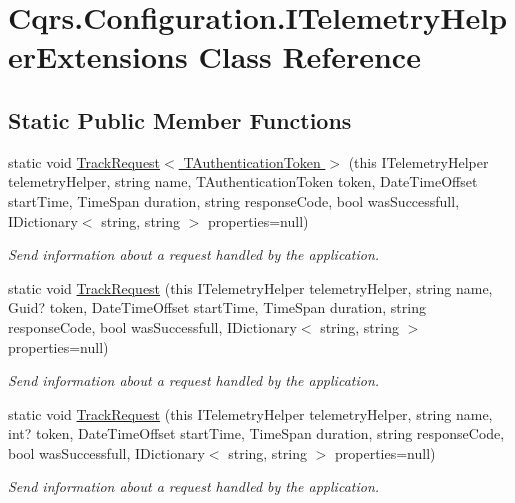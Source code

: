 \hypertarget{classCqrs_1_1Configuration_1_1ITelemetryHelperExtensions}{}\section{Cqrs.\+Configuration.\+I\+Telemetry\+Helper\+Extensions Class Reference}
\label{classCqrs_1_1Configuration_1_1ITelemetryHelperExtensions}
\subsection*{Static Public Member Functions}
\begin{DoxyCompactItemize}
\item 
static void \hyperlink{classCqrs_1_1Configuration_1_1ITelemetryHelperExtensions_a2e4bf3f56dbd0d10acac587499aca7ba}{Track\+Request$<$ T\+Authentication\+Token $>$} (this I\+Telemetry\+Helper telemetry\+Helper, string name, T\+Authentication\+Token token, Date\+Time\+Offset start\+Time, Time\+Span duration, string response\+Code, bool was\+Successfull, I\+Dictionary$<$ string, string $>$ properties=null)
\begin{DoxyCompactList}\small\item\em Send information about a request handled by the application. \end{DoxyCompactList}\item 
static void \hyperlink{classCqrs_1_1Configuration_1_1ITelemetryHelperExtensions_a8e248c0990f9abd8f9d7f06a6e82c1d6}{Track\+Request} (this I\+Telemetry\+Helper telemetry\+Helper, string name, Guid? token, Date\+Time\+Offset start\+Time, Time\+Span duration, string response\+Code, bool was\+Successfull, I\+Dictionary$<$ string, string $>$ properties=null)
\begin{DoxyCompactList}\small\item\em Send information about a request handled by the application. \end{DoxyCompactList}\item 
static void \hyperlink{classCqrs_1_1Configuration_1_1ITelemetryHelperExtensions_a4a954213d1a2e3782de2bd4ebe1ec2e9}{Track\+Request} (this I\+Telemetry\+Helper telemetry\+Helper, string name, int? token, Date\+Time\+Offset start\+Time, Time\+Span duration, string response\+Code, bool was\+Successfull, I\+Dictionary$<$ string, string $>$ properties=null)
\begin{DoxyCompactList}\small\item\em Send information about a request handled by the application. \end{DoxyCompactList}\item 

\end{DoxyCompactItemize}
